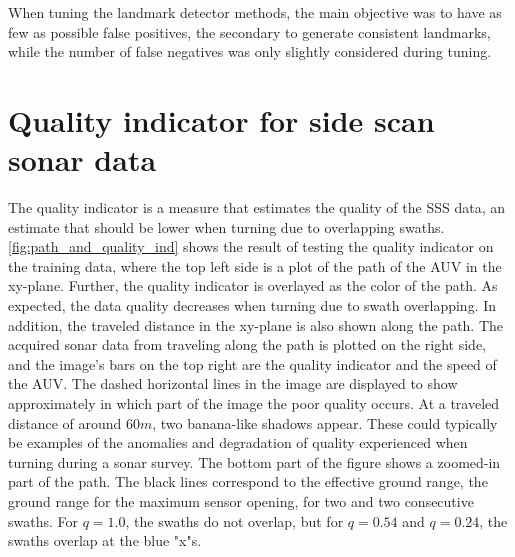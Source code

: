 When tuning the landmark detector methods, the main objective was to have as few as possible false positives, the secondary to generate consistent landmarks, while the number of false negatives was only slightly considered during tuning. 

\section{Quality indicator for side scan sonar data}

The quality indicator is a measure that estimates the quality of the SSS data, an estimate that should be lower when turning due to overlapping swaths. \cref{fig:path_and_quality_ind} shows the result of testing the quality indicator on the training data, where the top left side is a plot of the path of the AUV in the xy-plane. Further, the quality indicator is overlayed as the color of the path. As expected, the data quality decreases when turning due to swath overlapping. In addition, the traveled distance in the xy-plane is also shown along the path. The acquired sonar data from traveling along the path is plotted on the right side, and the image's bars on the top right are the quality indicator and the speed of the AUV. The dashed horizontal lines in the image are displayed to show approximately in which part of the image the poor quality occurs. At a traveled distance of around $60 m$, two banana-like shadows appear. These could typically be examples of the anomalies and degradation of quality experienced when turning during a sonar survey. The bottom part of the figure shows a zoomed-in part of the path. The black lines correspond to the effective ground range, the ground range for the maximum sensor opening, for two and two consecutive swaths. For $q = 1.0$, the swaths do not overlap, but for $q = 0.54$ and $q=0.24$, the swaths overlap at the blue "x"s. 

